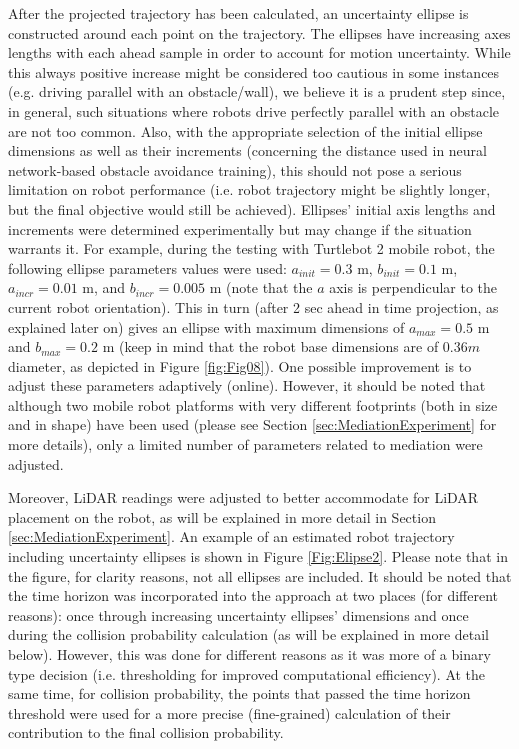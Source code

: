 After the projected trajectory has been calculated, an uncertainty ellipse is constructed around each point on the trajectory. The ellipses have increasing axes lengths with each ahead sample in order to account for motion uncertainty. While this always positive increase might be considered too cautious in some instances (e.g. driving parallel with an obstacle/wall), we believe it is a prudent step since, in general, such situations where robots drive perfectly parallel with an obstacle are not too common. Also, with the appropriate selection of the initial ellipse dimensions as well as their increments (concerning the distance used in neural network-based obstacle avoidance training), this should not pose a serious limitation on robot performance (i.e. robot trajectory might be slightly longer, but the final objective would still be achieved). Ellipses' initial axis lengths and increments were determined experimentally but may change if the situation warrants it. For example, during the testing with Turtlebot 2 mobile robot, the following ellipse parameters values were used: $a_{init} = 0.3$ m, $b_{init} = 0.1$ m, $a_{incr} = 0.01$ m, and $b_{incr} = 0.005$ m (note that the $a$ axis is perpendicular to the current robot orientation). This in turn (after 2 sec ahead in time projection, as explained later on) gives an ellipse with maximum dimensions of $a_{max} = 0.5$ m and $b_{max} = 0.2$ m (keep in mind that the robot base dimensions are of $0.36 m$ diameter, as depicted in Figure \ref{fig:Fig08}). One possible improvement is to adjust these parameters adaptively (online). However, it should be noted that although two mobile robot platforms with very different footprints (both in size and in shape) have been used (please see Section \ref{sec:MediationExperiment} for more details), only a limited number of parameters related to mediation were adjusted.

Moreover, LiDAR readings were adjusted to better accommodate for LiDAR placement on the robot, as will be explained in more detail in Section \ref{sec:MediationExperiment}. An example of an estimated robot trajectory including uncertainty ellipses is shown in Figure \ref{Fig:Elipse2}. Please note that in the figure, for clarity reasons, not all ellipses are included. It should be noted that the time horizon was incorporated into the approach at two places (for different reasons): once through increasing uncertainty ellipses' dimensions and once during the collision probability calculation (as will be explained in more detail below). However, this was done for different reasons as it was more of a binary type decision (i.e. thresholding for improved computational efficiency). At the same time, for collision probability, the points that passed the time horizon threshold were used for a more precise (fine-grained) calculation of their contribution to the final collision probability.

